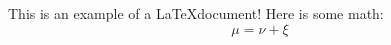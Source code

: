 \documentclass{article}
\begin{document}
This is an example of a \LaTeX document! Here is some math: $$\mu = \nu +\xi $$
\end{document}
